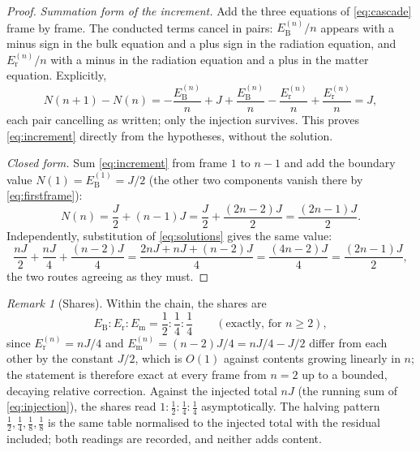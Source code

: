\documentclass[11pt]{amsbook}
\theoremstyle{plain}
\theoremstyle{definition}
\theoremstyle{remark}
\newtheorem{remark}[theorem]{Remark}
\begin{document}
\begin{proof}
\emph{Summation form of the increment.} Add the three equations of \cref{eq:cascade} frame by frame. The conducted terms cancel in pairs: $E_{\mathrm B}^{(n)}/n$ appears with a minus sign in the bulk equation and a plus sign in the radiation equation, and $E_{\mathrm r}^{(n)}/n$ with a minus in the radiation equation and a plus in the matter equation. Explicitly,
\begin{equation}\label{eq:telescope}
N(n+1) - N(n) = -\frac{E_{\mathrm B}^{(n)}}{n} + J + \frac{E_{\mathrm B}^{(n)}}{n} - \frac{E_{\mathrm r}^{(n)}}{n} + \frac{E_{\mathrm r}^{(n)}}{n} = J,
\end{equation}
each pair cancelling as written; only the injection survives. This proves \cref{eq:increment} directly from the hypotheses, without the solution.

\emph{Closed form.} Sum \cref{eq:increment} from frame $1$ to $n-1$ and add the boundary value $N(1) = E_{\mathrm B}^{(1)} = J/2$ (the other two components vanish there by \cref{eq:firstframe}):
\begin{equation}\label{eq:sumincrement}
N(n) = \frac{J}{2} + (n-1)J = \frac{J}{2} + \frac{(2n-2)J}{2} = \frac{(2n-1)J}{2}.
\end{equation}
Independently, substitution of \cref{eq:solutions} gives the same value:
\begin{equation}\label{eq:sumcheck}
\frac{nJ}{2} + \frac{nJ}{4} + \frac{(n-2)J}{4} = \frac{2nJ + nJ + (n-2)J}{4} = \frac{(4n-2)J}{4} = \frac{(2n-1)J}{2},
\end{equation}
the two routes agreeing as they must.
\end{proof}

\begin{remark}[Shares]\label{rem:shares}
Within the chain, the shares are
\begin{equation}\label{eq:shares}
E_{\mathrm B} : E_{\mathrm r} : E_{\mathrm m} = \frac{1}{2} : \frac{1}{4} : \frac{1}{4} \qquad (\text{exactly, for } n \geq 2),
\end{equation}
since $E_{\mathrm r}^{(n)} = nJ/4$ and $E_{\mathrm m}^{(n)} = (n-2)J/4 = nJ/4 - J/2$ differ from each other by the constant $J/2$, which is $O(1)$ against contents growing linearly in $n$; the statement is therefore exact at every frame from $n = 2$ up to a bounded, decaying relative correction. Against the injected total $nJ$ (the running sum of \cref{eq:injection}), the shares read $1 : \tfrac12 : \tfrac14 : \tfrac14$ asymptotically. The halving pattern $\tfrac12, \tfrac14, \tfrac18, \tfrac18$ is the same table normalised to the injected total with the residual included; both readings are recorded, and neither adds content.
\end{remark}
\end{document}
